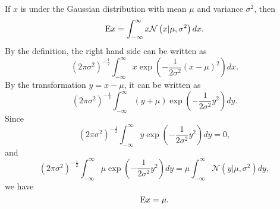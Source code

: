 \subsection{}
If $x$ is under the Gaussian distribution with mean $\mu$ and variance $\sigma ^ 2$, then
%
\begin{equation}
{\rm E} x = \int_{-\infty}^{\infty} x \mathcal{N} \left( x | \mu, \sigma ^ 2 \right) dx.
\end{equation}
%
By the definition, the right hand side can be written as
%
\begin{equation}
\left( 2 \pi \sigma ^ 2 \right) ^ {-\frac{1}{2}} \int_{-\infty}^{\infty} x \exp \left( -\frac{1}{2 \sigma ^ 2} (x - \mu) ^ 2 \right) dx.
\end{equation}
%
By the transformation $y = x - \mu$, it can be written as 
%
\begin{equation}
\left( 2 \pi \sigma ^ 2 \right) ^ {-\frac{1}{2}} \int_{-\infty}^{\infty} (y + \mu) \exp \left( -\frac{1}{2 \sigma ^ 2}y ^ 2 \right) dy.
\end{equation}
%
Since 
%
\begin{equation}
\left( 2 \pi \sigma ^ 2 \right) ^ {-\frac{1}{2}} \int_{-\infty}^{\infty} y \exp \left( -\frac{1}{2 \sigma ^ 2}y ^ 2 \right) dy = 0,
\end{equation}
%
and
%
\begin{equation}
\left( 2 \pi \sigma ^ 2 \right) ^ {-\frac{1}{2}} \int_{-\infty}^{\infty} \mu \exp \left( -\frac{1}{2 \sigma ^ 2}y ^ 2 \right) dy = \mu \int_{- \infty}^{\infty} \mathcal{N} \left( y | \mu, \sigma ^ 2 \right) dy,
\end{equation}
%
we have
%
\begin{equation}
{\rm E} x = \mu.
\end{equation}
%

